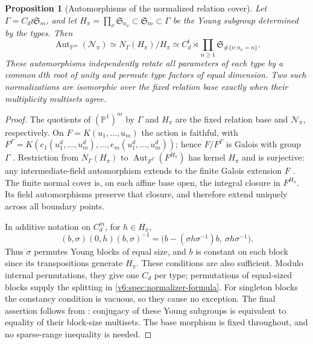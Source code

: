 \documentclass[10pt,fleqn]{article}
\numberwithin{equation}{section}
\newtheorem{proposition}[theorem]{Proposition}
\newcommand{\PP}{\mathbb P}
\begin{document}
\begin{proposition}[Automorphisms of the normalized relation cover]
\label{v6:spec:normalizer}
Let $\Gamma=C_d\wr\mathfrak S_m$, and let
$H_\pi=\prod_\nu\mathfrak S_{n_\nu}\subset\mathfrak S_m
\subset\Gamma$ be the Young subgroup determined by the types.  Then
\begin{equation}\label{v6:spec:normalizer-formula}
 \operatorname{Aut}_{\PP^m}(\mathcal N_\pi)
 \simeq N_\Gamma(H_\pi)/H_\pi
 \simeq C_d^t\rtimes
       \prod_{n\ge1}\mathfrak S_{\#\{\nu:n_\nu=n\}}.
\end{equation}
These automorphisms independently rotate all parameters of each type
by a common $d$th root of unity and permute type factors of equal
dimension.  Two such normalizations are isomorphic over the fixed
relation base exactly when their multiplicity multisets agree.
\end{proposition}

\begin{proof}
The quotients of $(\PP^1)^m$ by $\Gamma$ and $H_\pi$ are the
fixed relation base and $\mathcal N_\pi$, respectively.  On
$F=K(u_1,\ldots,u_m)$ the action is faithful, with
$F^\Gamma=K(e_1(u_1^d,\ldots,u_m^d),\ldots,e_m(u_1^d,\ldots,u_m^d))$;
hence $F/F^\Gamma$ is Galois with group $\Gamma$
\cite[Tag~09I3]{Stacks}.  Restriction from $N_\Gamma(H_\pi)$ to
$\operatorname{Aut}_{F^\Gamma}(F^{H_\pi})$ has kernel $H_\pi$ and is
surjective: any intermediate-field automorphism extends to the finite
Galois extension $F$ \cite[Tag~0BME]{Stacks}.  The finite normal cover is, on each affine
base open, the integral closure in $F^{H_\pi}$.  Its field
automorphisms preserve that closure, and therefore extend uniquely
across all boundary points.

In additive notation on $C_d^m$, for $h\in H_\pi$,
\[
 (b,\sigma)(0,h)(b,\sigma)^{-1}
  =\bigl(b-(\sigma h\sigma^{-1})b,\ \sigma h\sigma^{-1}\bigr).
\]
Thus $\sigma$ permutes Young blocks of equal size, and $b$ is
constant on each block since its transpositions generate $H_\pi$.
These conditions are also sufficient.  Modulo internal permutations,
they give one $C_d$ per type; permutations of equal-sized blocks
supply the splitting in \eqref{v6:spec:normalizer-formula}.
For singleton blocks the constancy condition is vacuous, so they
cause no exception.  The final assertion follows from \cite[Proposition~5.1]{LiProfileGeometry}:
conjugacy of these Young subgroups is equivalent to equality of their
block-size multisets.  The base morphism is fixed throughout, and
no sparse-range inequality is needed.
\end{proof}
\end{document}
